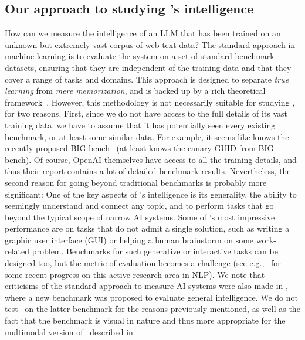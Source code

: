 \subsection{Our approach to studying \DV's intelligence}
How can we measure the intelligence of an LLM that has been trained on an unknown but extremely vast corpus of web-text data? The standard approach in machine learning is to evaluate the system on a set of standard benchmark datasets, ensuring that they are independent of the training data and that they cover a range of tasks and domains. This approach is designed to separate {\em true learning} from {\em mere memorization}, and is backed up by a rich theoretical framework~\cite{shalev2014understanding, mohri2018foundations}. However, this methodology is not necessarily suitable for studying {\DV}, for two reasons. First, since we do not have access to the full details of its vast training data, we have to assume that it has potentially seen every existing benchmark, or at least some similar data. For example, it seems like {\DV} knows the recently proposed BIG-bench~\cite{srivastava2022beyond} (at least {\DV} knows the canary GUID from BIG-bench). Of course, OpenAI themselves have access to all the training details, and thus their report \cite{gpt4} contains a lot of detailed benchmark results. Nevertheless, the second reason for going beyond traditional benchmarks is probably more significant:
One of the key aspects of \DV's intelligence is its generality, the ability to seemingly understand and connect any topic, and to perform tasks that go beyond the typical scope of narrow AI systems. Some of \DV's most impressive performance are on tasks that do not admit a single solution, such as writing a graphic user interface (GUI) or helping a human brainstorm on some work-related problem. Benchmarks for such generative or interactive tasks can be designed too, but the metric of evaluation becomes a challenge (see e.g.,~\cite{NEURIPS2021_260c2432} for some recent progress on this active research area in NLP). We note that criticisms of the standard approach to measure AI systems were also made in \cite{chollet2019measure}, where a new benchmark was proposed to evaluate general intelligence. We do not test \DV\ on the latter benchmark for the reasons previously mentioned, as well as the fact that the benchmark is visual in nature and thus more appropriate for the multimodal version of \DV\ described in \cite{gpt4}.
\newline

